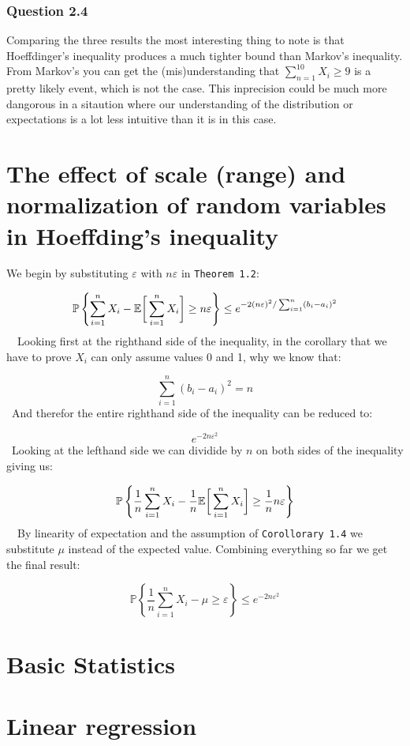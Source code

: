 \documentclass{article}
\begin{document}
\subsubsection*{Question 2.4}
Comparing the three results the most interesting thing to note is that
Hoeffdinger's inequality produces a much tighter bound than Markov's
inequality. From Markov's you can get the (mis)understanding that
\(\sum_{n=1}^{10} X_i \ge 9\) is a pretty likely event, which is not the
case. This inprecision could be much more dangorous in a sitaution where our
understanding of the distribution or expectations is a lot less intuitive than
it is in this case.



\section{The effect of scale (range) and normalization of random variables in Hoeffding’s inequality}
We begin by substituting \(\varepsilon\) with \(n\varepsilon\) in \texttt{Theorem 1.2}:

\[
\mathbb{P}\left\{\displaystyle\sum_{i=1}^{n} X_i -
{\mathbb{E}}\bigg[\displaystyle\sum_{i=1}^{n} X_i \bigg] \ge n\varepsilon \right\}
\le e^{-2(n\varepsilon)^2/\sum_{i=1}^{n}(b_i-a_i)^2}
\]
\
\
Looking first at the righthand side of the inequality, in the corollary that
we have to prove \(X_i\) can only assume values 0 and 1, why we know that:

\[
\sum_{i=1}^{n}(b_i-a_i)^2 = n
\]
\
And therefor the entire righthand side of the inequality can be reduced to:

\[
e^{-2n\varepsilon^2}
\]
\
Looking at the lefthand side we can dividide by \(n\) on both
sides of the inequality giving us:

\[
\mathbb{P}\left\{\dfrac{1}{n}\displaystyle\sum_{i=1}^{n} X_i -
\dfrac{1}{n}{\mathbb{E}}\bigg[\displaystyle\sum_{i=1}^{n} X_i \bigg] \ge \dfrac{1}{n} n\varepsilon \right\}
\]
\
\
By linearity of expectation and the assumption of \texttt{Corollorary 1.4}
we substitute \(\mu\) instead of the expected value. Combining everything so far
we get the final result:

\[
\mathbb{P}\left\{\dfrac{1}{n}\displaystyle\sum_{i=1}^{n} X_i -
\mu \ge \varepsilon \right\} \le e^{-2n\varepsilon^2}
\]

\section{Basic Statistics}
\section{Linear regression}

\printbibliography
\end{document}
